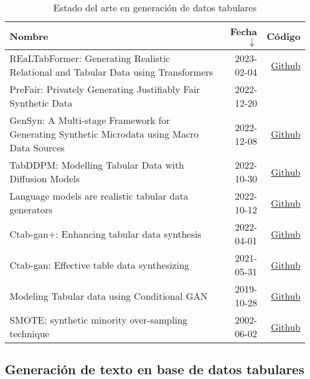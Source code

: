 \begin{table}[H]
	\centering
	\caption{Estado del arte en generación de datos tabulares}
	\label{tab-sota-tab}
    \begin{tabular}{|m{25em}|r|r|}
    \hline
    \rowcolor[gray]{0.8}
    Nombre & Fecha $\downarrow$ & Código \\
    \hline
    REaLTabFormer: Generating Realistic Relational and Tabular Data using Transformers \cite{solatorio_realtabformer_2023}
    & 2023-02-04 & \href{https://github.com/avsolatorio/REaLTabFormer}{Github} \\
    \hline
    PreFair: Privately Generating Justifiably Fair Synthetic Data \cite{pujol_prefair_2022}
    & 2022-12-20 & \\
    \hline
    GenSyn: A Multi-stage Framework for Generating Synthetic Microdata using Macro Data Sources \cite{acharya_gensyn_2022}
    & 2022-12-08 & \href{https://github.com/Angeela03/GenSyn}{Github} \\
    \hline
    TabDDPM: Modelling Tabular Data with Diffusion Models \cite{kotelnikov_tabddpm_2022}
    & 2022-10-30 & \href{https://github.com/rotot0/tab-ddpm}{Github} \\
    \hline
    Language models are realistic tabular data generators \cite{borisov_language_2022}
    & 2022-10-12 & \href{https://github.com/kathrinse/be_great}{Github} \\
    \hline
    Ctab-gan+: Enhancing tabular data synthesis \cite{zhao_ctab-gan_2022}
    & 2022-04-01 & \href{https://github.com/Team-TUD/CTAB-GAN-Plus}{Github} \\
    \hline
    Ctab-gan: Effective table data synthesizing \cite{zhao_ctab-gan_2021}
    & 2021-05-31 & \href{https://github.com/Team-TUD/CTAB-GAN}{Github} \\
    \hline
    Modeling Tabular data using Conditional GAN \cite{xu_modeling_2019}
    & 2019-10-28 & \href{https://github.com/sdv-dev/SDV}{Github} \\
    \hline
    SMOTE: synthetic minority over-sampling technique \cite{chawla_smote_2002}
    & 2002-06-02 & \href{https://github.com/scikit-learn-contrib/imbalanced-learn}{Github} \\
    \hline
    \end{tabular}
\end{table}

\newpage
\subsection{Generación de texto en base de datos tabulares}

